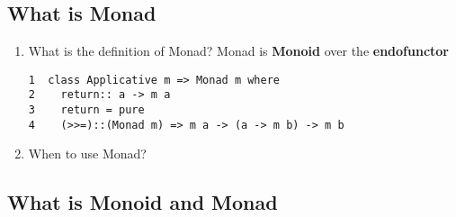 \documentclass[11pt]{article}
\begin{document}
\subsection{What is Monad}
\label{sec:org1225608}
\begin{enumerate}
\item What is the definition of Monad?
Monad is \textbf{Monoid} over the \textbf{endofunctor}
\begin{verbatim}
1  class Applicative m => Monad m where
2    return:: a -> m a
3    return = pure
4    (>>=)::(Monad m) => m a -> (a -> m b) -> m b
\end{verbatim}
\item When to use Monad?
\end{enumerate}

\subsection{What is Monoid and Monad}
\label{sec:org8fa69da}
\end{document}
